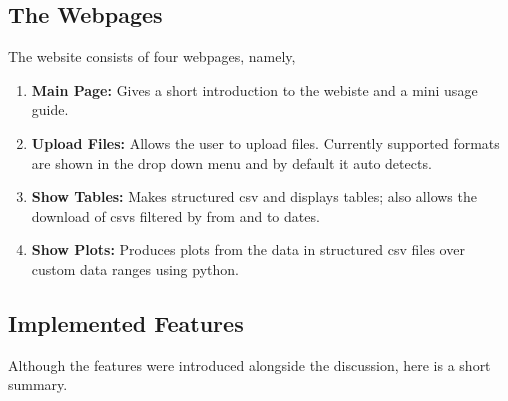 \documentclass[11pt]{scrartcl}
\begin{document}
\subsection{The Webpages}

The website consists of four webpages, namely,

\begin{enumerate}
  \item \textbf{Main Page:} Gives a short introduction to the webiste and a mini
    usage guide.
  \item \textbf{Upload Files:} Allows the user to upload files. Currently
    supported formats are shown in the drop down menu and by default it auto
    detects.
  \item \textbf{Show Tables:} Makes structured csv and displays tables; also
    allows the download of csvs filtered by from and to dates.
  \item \textbf{Show Plots:} Produces plots from the data in structured csv
    files over custom data ranges using python.
\end{enumerate}

\subsection{Implemented Features}
\label{features}

Although the features were introduced alongside the discussion, here is a
short summary.
\end{document}

